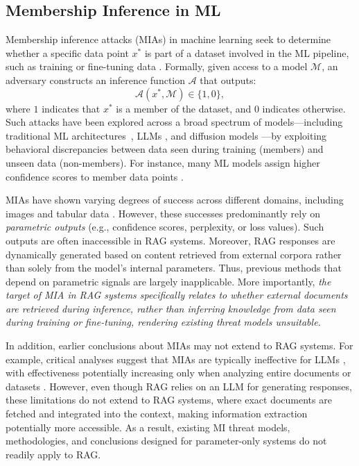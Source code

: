 \subsection{\bf Membership Inference in ML}
\label{sec:MI_in_ML}

Membership inference attacks (MIAs) in machine learning seek to determine whether a specific data point \( x^* \) is part of a dataset involved in the ML pipeline, such as training \citep{shokri2017membership, nasr2019comprehensive, sablayrolles2019white, watson2022on, carlini2022membership} or fine-tuning data \cite{fu2024membership, mattern2023membership}. Formally, given access to a model \( \mathcal{M} \), an adversary constructs an inference function \( \mathcal{A} \) that outputs:
\[
\mathcal{A}(x^*, \mathcal{M}) \in \{1, 0\},
\]
where \( 1 \) indicates that \( x^* \) is a member of the dataset, and \( 0 \) indicates otherwise. Such attacks have been explored across a broad spectrum of models—including traditional ML architectures~\citep{shokri2017membership}, LLMs \citep{duan2024membership}, and diffusion models \citep{duan2023diffusion}—by exploiting behavioral discrepancies between data seen during training (members) and unseen data (non-members). For instance, many ML models assign higher confidence scores to member data points \citep{shokri2017membership}.

MIAs have shown varying degrees of success across different domains, including images and tabular data \citep{zarifzadeh2024low, carlini2022membership, suri2024do, shokri2017membership}. However, these successes predominantly rely on \textit{parametric outputs} (e.g., confidence scores, perplexity, or loss values). Such outputs are often inaccessible in RAG systems. Moreover, RAG responses are dynamically generated based on content retrieved from external corpora rather than solely from the model's internal parameters. Thus, previous methods that depend on parametric signals are largely inapplicable. More importantly, \emph{the target of MIA in RAG systems specifically relates to whether external documents are retrieved during inference, rather than inferring knowledge from data seen during training or fine-tuning, rendering existing threat models unsuitable.}

In addition, earlier conclusions about MIAs may not extend to RAG systems. For example, critical analyses suggest that MIAs are typically ineffective for LLMs \citep{duan2024membership, meeus2024sok}, with effectiveness potentially increasing only when analyzing entire documents or datasets \citep{puerto2024scaling, maini2024llm}. However, even though RAG relies on an LLM for generating responses, these limitations do not extend to RAG systems, where exact documents are fetched and integrated into the context, making information extraction potentially more accessible.
As a result, existing MI threat models, methodologies, and conclusions designed for parameter-only systems do not readily apply to RAG. 




